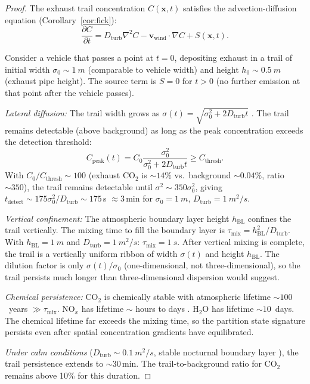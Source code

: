\documentclass[11pt,twocolumn,a4paper]{article}
\theoremstyle{plain}
\theoremstyle{definition}
\theoremstyle{remark}
\newcommand{\taumix}{\tau_{\mathrm{mix}}}
\newcommand{\Dturb}{D_{\mathrm{turb}}}
\newcommand{\hBL}{h_{\mathrm{BL}}}
\begin{document}
\begin{proof}
The exhaust trail concentration $C(\mathbf{x}, t)$ satisfies the advection-diffusion equation (Corollary~\ref{cor:fick}):
\begin{equation}
\frac{\partial C}{\partial t} = \Dturb \nabla^2 C - \mathbf{v}_{\mathrm{wind}} \cdot \nabla C + S(\mathbf{x}, t).
\label{eq:trail_diffusion}
\end{equation}

Consider a vehicle that passes a point at $t = 0$, depositing exhaust in a trail of initial width $\sigma_0 \sim \SI{1}{m}$ (comparable to vehicle width) and height $h_0 \sim \SI{0.5}{m}$ (exhaust pipe height). The source term is $S = 0$ for $t > 0$ (no further emission at that point after the vehicle passes).

\emph{Lateral diffusion:} The trail width grows as $\sigma(t) = \sqrt{\sigma_0^2 + 2 \Dturb t}$ \cite{taylor1921diffusion, pasquill1983atmospheric}. The trail remains detectable (above background) as long as the peak concentration exceeds the detection threshold:
\begin{equation}
C_{\mathrm{peak}}(t) = C_0 \frac{\sigma_0^2}{\sigma_0^2 + 2\Dturb t} \geq C_{\mathrm{thresh}}.
\label{eq:peak_concentration}
\end{equation}
With $C_0 / C_{\mathrm{thresh}} \sim 100$ (exhaust CO$_2$ is $\sim 14\%$ vs.\ background $\sim 0.04\%$, ratio $\sim 350$), the trail remains detectable until $\sigma^2 \sim 350 \sigma_0^2$, giving $t_{\mathrm{detect}} \sim 175 \sigma_0^2 / \Dturb \sim 175$\,s $\approx 3$\,min for $\sigma_0 = \SI{1}{m}$, $\Dturb = \SI{1}{m^2/s}$.

\emph{Vertical confinement:} The atmospheric boundary layer height $\hBL$ confines the trail vertically. The mixing time to fill the boundary layer is $\taumix = \hBL^2 / \Dturb$. With $\hBL = \SI{1}{m}$ and $\Dturb = \SI{1}{m^2/s}$: $\taumix = \SI{1}{s}$. After vertical mixing is complete, the trail is a vertically uniform ribbon of width $\sigma(t)$ and height $\hBL$. The dilution factor is only $\sigma(t)/\sigma_0$ (one-dimensional, not three-dimensional), so the trail persists much longer than three-dimensional dispersion would suggest.

\emph{Chemical persistence:} CO$_2$ is chemically stable with atmospheric lifetime $\sim 100$~years $\gg \taumix$. NO$_x$ has lifetime $\sim$ hours to days \cite{seinfeld2016atmospheric}. H$_2$O has lifetime $\sim 10$~days. The chemical lifetime far exceeds the mixing time, so the partition state signature persists even after spatial concentration gradients have equilibrated.

\emph{Under calm conditions} ($\Dturb \sim \SI{0.1}{m^2/s}$, stable nocturnal boundary layer \cite{stull1988introduction}), the trail persistence extends to $\sim 30$\,min. The trail-to-background ratio for CO$_2$ remains above 10\% for this duration.
\end{proof}
\end{document}
